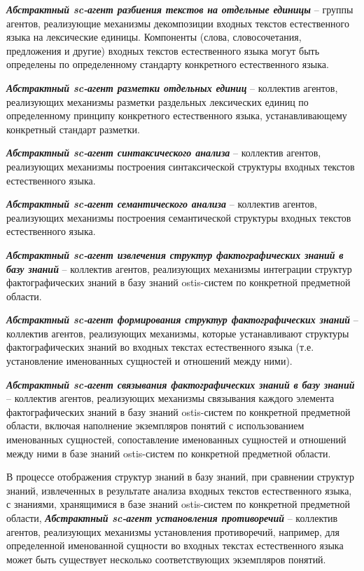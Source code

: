 \textit{\textbf{Абстрактный sc-агент разбиения текстов на отдельные единицы}} -- группы агентов, реализующие механизмы декомпозиции входных текстов естественного языка на лексические единицы. Компоненты (слова, словосочетания, предложения и другие) входных текстов естественного языка могут быть определены по определенному стандарту конкретного естественного языка.

\textit{\textbf{Абстрактный sc-агент разметки отдельных единиц}} -- коллектив агентов, реализующих механизмы разметки раздельных лексических единиц по определенному принципу конкретного естественного языка, устанавливающему конкретный стандарт разметки. 

\textit{\textbf{Абстрактный sc-агент синтаксического анализа}} -- коллектив агентов, реализующих механизмы построения синтаксической структуры входных текстов естественного языка.

\textit{\textbf{Абстрактный sc-агент семантического анализа}} -- коллектив агентов, реализующих механизмы построения семантической структуры входных текстов естественного языка.

\textit{\textbf{Абстрактный sc-агент извлечения структур фактографических знаний в базу знаний}} -- коллектив агентов, реализующих механизмы интеграции структур фактографических знаний в базу знаний ostis-систем по конкретной предметной области.

\textit{\textbf{Абстрактный sc-агент формирования структур фактографических знаний}} -- коллектив агентов, реализующих механизмы, которые устанавливают структуры фактографических знаний во входных текстах естественного языка (т.е. установление именованных сущностей и отношений между ними).

\textit{\textbf{Абстрактный sc-агент связывания фактографических знаний в базу знаний}} -- коллектив агентов, реализующих механизмы связывания каждого элемента фактографических знаний в базу знаний ostis-систем по конкретной предметной области, включая наполнение экземпляров понятий с использованием именованных сущностей, сопоставление именованных сущностей и отношений между ними в базе знаний ostis-систем по конкретной предметной области.

В процессе отображения структур знаний в базу знаний, при сравнении структур знаний, извлеченных в результате анализа входных текстов естественного языка, с знаниями, хранящимися в базе знаний ostis-систем по конкретной предметной области, \textit{\textbf{Абстрактный sc-агент установления противоречий}} -- коллектив агентов, реализующих механизмы установления противоречий, например, для определенной именованной сущности во входных текстах естественного языка может быть существует несколько соответствующих экземпляров понятий. 

